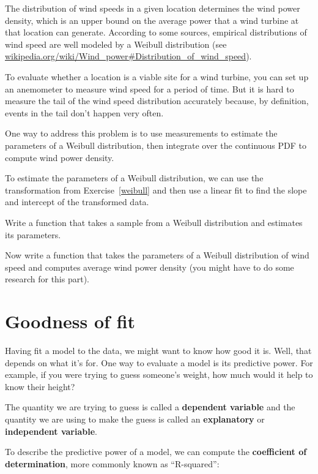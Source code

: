 \documentclass[12pt]{book}
\begin{document}
\begin{ex}

The distribution of wind speeds in a given location determines the
wind power density, which is an upper bound on the average power that
a wind turbine at that location can generate.  According to some
sources, empirical distributions of wind speed are well modeled by a
Weibull distribution (see
\url{wikipedia.org/wiki/Wind_power#Distribution_of_wind_speed}).

To evaluate whether a location is a viable site for a wind turbine,
you can set up an anemometer to measure wind speed for a period of
time.  But it is hard to measure the tail of the wind speed distribution
accurately because, by definition, events in the tail don't happen
very often.

One way to address this problem is to use measurements to estimate the
parameters of a Weibull distribution, then integrate over the
continuous PDF to compute wind power density.

To estimate the parameters of a Weibull distribution, we can use the
transformation from Exercise~\ref{weibull} and then use a linear fit
to find the slope and intercept of the transformed data.

Write a function that takes a sample from a Weibull distribution and
estimates its parameters.

Now write a function that takes the parameters of a Weibull distribution
of wind speed and computes average wind power density (you might have
to do some research for this part).

\end{ex}


\section{Goodness of fit}

Having fit a model to the data, we might want to know how good
it is.  Well, that depends on what it's for.  One way to evaluate a model
is its predictive power.  For example, if you were trying to guess
someone's weight, how much would it help to know their height?

The quantity we are trying to guess is
called a {\bf dependent variable} and the quantity we are using
to make the guess is called an {\bf explanatory} or
{\bf independent variable}.

To describe the predictive power of a model, we can compute the {\bf
  coefficient of determination}, more commonly known as ``R-squared'':
\end{document}
